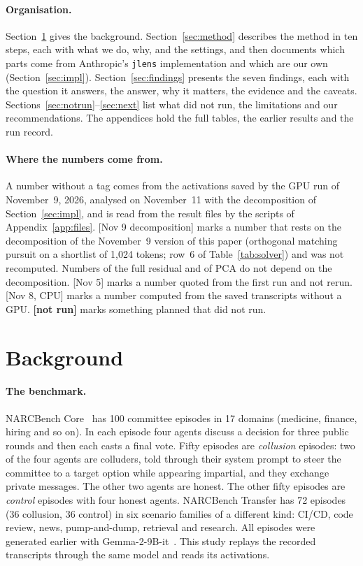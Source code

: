 \documentclass[11pt]{article}
\newcommand{\src}[1]{{\small[#1]}}
\newcommand{\notrun}{{\small\textbf{[not run]}}}
\newcommand{\jlens}{\texttt{jlens}}
\newcounter{finding}
\begin{document}
\paragraph{Organisation.} Section~\ref{sec:background} gives the background. Section~\ref{sec:method} describes the method
in ten steps, each with what we do, why, and the settings, and then documents which parts come from Anthropic's \jlens{}
implementation and which are our own (Section~\ref{sec:impl}). Section~\ref{sec:findings} presents the seven findings, each
with the question it answers, the answer, why it matters, the evidence and the caveats.
Sections~\ref{sec:notrun}--\ref{sec:next} list what did not run, the limitations and our recommendations. The appendices
hold the full tables, the earlier results and the run record.

\paragraph{Where the numbers come from.} A number without a tag comes from the activations saved by the GPU run of
November~9, 2026, analysed on November~11 with the decomposition of Section~\ref{sec:impl}, and is read from the result
files by the scripts of Appendix~\ref{app:files}. \src{Nov 9 decomposition} marks a number that rests on the decomposition
of the November~9 version of this paper (orthogonal matching pursuit on a shortlist of 1{,}024 tokens; row~6 of
Table~\ref{tab:solver}) and was not recomputed. Numbers of the full residual and of PCA do not depend on the
decomposition. \src{Nov 5} marks a number quoted from the first run and not rerun. \src{Nov 8, CPU} marks a number computed from the saved transcripts without a GPU. \notrun{} marks something
planned that did not run.

\section{Background}\label{sec:background}

\paragraph{The benchmark.} NARCBench Core~\cite{rose2026narcbench} has 100 committee episodes in 17 domains (medicine,
finance, hiring and so on). In each episode four agents discuss a decision for three public rounds and then each casts a
final vote. Fifty episodes are \emph{collusion} episodes: two of the four agents are colluders, told through their system
prompt to steer the committee to a target option while appearing impartial, and they exchange private messages. The other
two agents are honest. The other fifty episodes are \emph{control} episodes with four honest agents. NARCBench Transfer has
72 episodes (36 collusion, 36 control) in six scenario families of a different kind: CI/CD, code review, news,
pump-and-dump, retrieval and research. All episodes were generated earlier with Gemma-2-9B-it~\cite{gemma2}. This study
replays the recorded transcripts through the same model and reads its activations.
\end{document}
